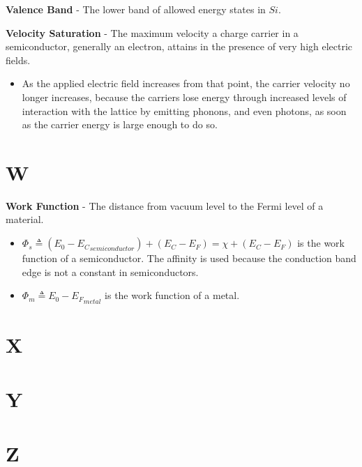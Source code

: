 \vspace{0.5cm}
\noindent
    \textbf{Valence Band} - The lower band of allowed energy states in $Si$.

\vspace{0.5cm}
\noindent
    \textbf{Velocity Saturation} - The maximum velocity a charge carrier in a semiconductor, generally an electron, attains in the presence of very high electric fields.
    \vspace{0.15cm}
    \begin{itemize}
        \setlength\itemsep{0.5em}
        \item{As the applied electric field increases from that point, the carrier velocity no longer increases, because the carriers lose energy through increased levels of interaction with the lattice by emitting phonons, and even photons, as soon as the carrier energy is large enough to do so.}
    \end{itemize}
\section{W}
    \textbf{Work Function} - The distance from vacuum level to the Fermi level of a material.
    \vspace{0.15cm}
    \begin{itemize}
        \setlength\itemsep{0.5em}
        \item{$\Phi_s \triangleq (E_0 - {E_C}_{semiconductor}) + (E_C - E_F) = \chi + (E_C - E_F)$ is the work function of a semiconductor.  The affinity is used because the conduction band edge is not a constant in semiconductors.}
        \item{$\Phi_m \triangleq E_0 - {E_F}_{metal}$ is the work function of a metal.}
    \end{itemize}
\section{X}
\section{Y}
\section{Z}
